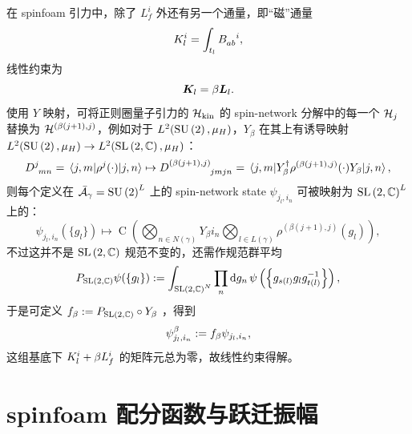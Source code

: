 			在 spinfoam 引力中，除了 $L^i_f$ 外还有另一个通量，即“磁”通量
			\begin{equation}
				K^i_l = \int_{t_l} \tensor{B}{_a_b^i},
			\end{equation}
			线性约束为
			\begin{equation}
				\vb*{K}_l = \beta \vb*{L}_l.
			\end{equation}
			使用 $Y$ 映射，可将正则圈量子引力的 $\mathcal{H}_{\text{kin}}$ 的 spin-network 分解中的每一个 $\mathcal{H}_j$ 替换为 $\mathcal{H}^{(\beta(j+1),j)}$，例如对于 $L^2(\mathrm{SU}\left(2\right),\mu_H)$，$Y_\beta$ 在其上有诱导映射 $L^2(\mathrm{SU}\left(2\right),\mu_H) \rightarrow L^2(\mathrm{SL}\left( 2,\mathbb{C} \right),\mu_H)$：
			\begin{equation}
				\tensor{D}{^j_m_n}=\mel{j,m}{\rho^j(\cdot)}{j,n} \mapsto \tensor{D}{^{(\beta(j+1),j)}_{jm jn}}=\mel{j,m}{Y^\dagger_\beta \rho^{(\beta(j+1),j)}(\cdot)Y_\beta}{j,n},
			\end{equation}
			则每个定义在 $\bar{\mathcal{A}}_\gamma = \mathrm{SU}\left(2\right)^L$ 上的 spin-network state $\psi_{j_l,i_n}$ 可被映射为 $\mathrm{SL}\left( 2,\mathbb{C} \right)^L$ 上的：
			\begin{equation}
				\psi_{j_l,i_n}(\{g_l\}) \mapsto \operatorname{C} \left( \bigotimes_{n\in N(\gamma)} Y_\beta i_n \bigotimes_{l\in L(\gamma)} \rho^{(\beta(j+1),j)}(g_l) \right),
			\end{equation}
			不过这并不是 $\mathrm{SL}\left( 2,\mathbb{C} \right)$ 规范不变的，还需作规范群平均
			\begin{equation}
				P_{\mathrm{SL}\left( 2,\mathbb{C} \right)} \psi(\left\{ g_l\right\}) := \int_{\mathrm{SL}\left( 2,\mathbb{C} \right)^N} \prod_{n} \dd{g_n} \psi\left( \left\{ g_{s(l)} g_l g_{t(l)}^{-1} \right\} \right),
			\end{equation}
			于是可定义 $f_\beta := P_{\mathrm{SL}\left( 2,\mathbb{C} \right)} \circ Y_\beta$ ，得到
			\begin{equation}
				\psi^\beta_{j_l,i_n} := f_\beta \psi_{j_l,i_n},
			\end{equation}
			这组基底下 $\tensor*{K}{^i_l} + \beta \tensor*{L}{^i_f}$ 的矩阵元总为零，故线性约束得解。

		\section{spinfoam 配分函数与跃迁振幅}

